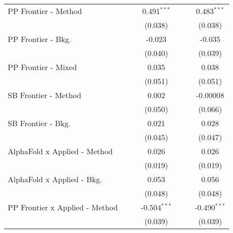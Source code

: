 \begin{tabular}{lcccccc}
   PP Frontier - Method           &                &              & 0.491$^{***}$  &                &              & 0.483$^{***}$\\   
                                  &                &              & (0.038)        &                &              & (0.038)\\   
   PP Frontier - Bkg.             &                &              & -0.023         &                &              & -0.035\\   
                                  &                &              & (0.040)        &                &              & (0.039)\\   
   PP Frontier - Mixed            &                &              & 0.035          &                &              & 0.038\\   
                                  &                &              & (0.051)        &                &              & (0.051)\\   
   SB Frontier - Method           &                &              & 0.002          &                &              & -0.00008\\   
                                  &                &              & (0.050)        &                &              & (0.066)\\   
   SB Frontier - Bkg.             &                &              & 0.021          &                &              & 0.028\\   
                                  &                &              & (0.045)        &                &              & (0.047)\\   
   AlphaFold x Applied - Method   &                &              & 0.026          &                &              & 0.026\\   
                                  &                &              & (0.019)        &                &              & (0.019)\\   
   AlphaFold x Applied - Bkg.     &                &              & 0.053          &                &              & 0.056\\   
                                  &                &              & (0.048)        &                &              & (0.048)\\   
   PP Frontier x Applied - Method &                &              & -0.504$^{***}$ &                &              & -0.490$^{***}$\\   
                                  &                &              & (0.039)        &                &              & (0.039)\\   

\end{tabular}
